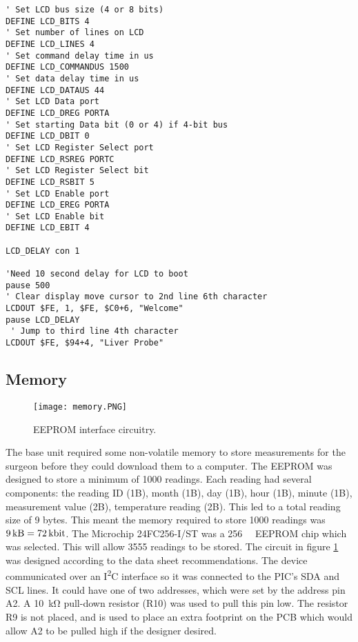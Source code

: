 \begin{lstlisting}
' Set LCD bus size (4 or 8 bits)
DEFINE LCD_BITS 4
' Set number of lines on LCD
DEFINE LCD_LINES 4
' Set command delay time in us
DEFINE LCD_COMMANDUS 1500
' Set data delay time in us
DEFINE LCD_DATAUS 44
' Set LCD Data port
DEFINE LCD_DREG PORTA
' Set starting Data bit (0 or 4) if 4-bit bus
DEFINE LCD_DBIT 0
' Set LCD Register Select port
DEFINE LCD_RSREG PORTC
' Set LCD Register Select bit
DEFINE LCD_RSBIT 5
' Set LCD Enable port
DEFINE LCD_EREG PORTA
' Set LCD Enable bit
DEFINE LCD_EBIT 4

LCD_DELAY con 1

'Need 10 second delay for LCD to boot
pause 500            
' Clear display move cursor to 2nd line 6th character
LCDOUT $FE, 1, $FE, $C0+6, "Welcome"         
pause LCD_DELAY
 ' Jump to third line 4th character
LCDOUT $FE, $94+4, "Liver Probe"                
\end{lstlisting}






\subsection{Memory}
\begin{figure}[htbp]
	\centering
	\texttt{[image: memory.PNG]}
	\caption{EEPROM interface circuitry.}
	\label{fig: memory schematic}
\end{figure}

The base unit required some non-volatile memory to store measurements for the surgeon before they could download them to a computer. The EEPROM was designed to store a minimum of 1000 readings. Each reading had several components: the reading ID (1B), month (1B), day (1B), hour (1B), minute (1B), measurement value (2B), temperature reading (2B). This led to a total reading size of 9 bytes. This meant the memory required to store 1000 readings was $\SI{9}{\kilo\byte}=\SI{72}{\kilo\bit}$. The Microchip 24FC256-I/ST \cite{memory} was a \SI{256}{\kilo\bit} EEPROM chip which was selected. This will allow 3555 readings to be stored. The circuit in figure \ref{fig: memory schematic} was designed according to the data sheet \cite{memory} recommendations. The device communicated over an I\textsuperscript{2}C interface so it was connected to the PIC's SDA and SCL lines. It could have one of two addresses, which were set by the address pin A2. A \SI{10}{\kilo\ohm} pull-down resistor (R10) was used to pull this pin low. The resistor R9 is not placed, and is used to place an extra footprint on the PCB which would allow A2 to be pulled high if the designer desired.\\


